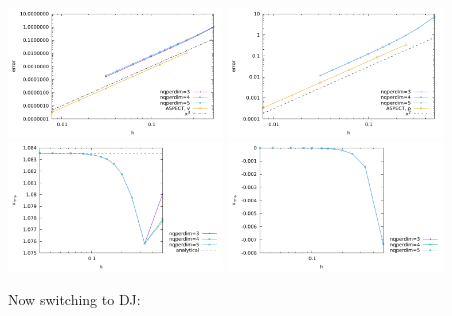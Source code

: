 \begin{center}
\includegraphics[width=5.7cm]{python_codes/fieldstone_133/results/bench1/errors_v.pdf}
\includegraphics[width=5.7cm]{python_codes/fieldstone_133/results/bench1/errors_p.pdf}\\
\includegraphics[width=5.7cm]{python_codes/fieldstone_133/results/bench1/vrms.pdf}
\includegraphics[width=5.7cm]{python_codes/fieldstone_133/results/bench1/area.pdf}
\end{center}

Now switching to DJ:

